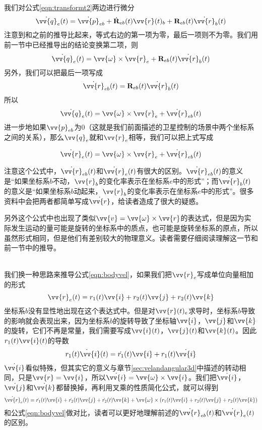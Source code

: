 \documentclass[11pt]{article}
\begin{document}
我们对公式\ref{eqn:transformt2}两边进行微分
\begin{equation*}
\dot{\vv{q}}_{e}(t) = \dot{ \vv{p}}_{eb} + \dot{{\bf R}}_{eb}(t)\vv{r}(t)_b +{\bf R}_{eb}(t)  \dot{\vv{r}}_b(t)
\end{equation*}
注意到和之前的推导比起来，等式右边的第一项为零，最后一项则不为零。我们用前一节中已经推导出的结论变换第二项，则
\begin{equation*}
\dot{\vv{q}}_{e}(t) = \vv{\omega} \times \vv{r}_e +{\bf R}_{eb}(t)  \dot{\vv{r}}_b(t)
\end{equation*}
另外，我们可以把最后一项写成
$$
\dot{\vv{r}}_{eb}(t) = {\bf R}_{eb}(t)  \dot{\vv{r}}_b(t)
$$
所以
$$
\dot{\vv{q}}_{e}(t) = \vv{\omega} \times \vv{r}_e + \dot{\vv{r}}_{eb}(t)
$$
进一步地如果$\vv{p}_{eb}$为0（这就是我们前面描述的卫星控制的场景中两个坐标系之间的关系），那么$\vv{q}_e$就和$\vv{r}_e$相等，我们可以把上式写成

\begin{equation}\label{eqn:bodyvel}
\dot{\vv{r}}_{e}(t) = \vv{\omega} \times \vv{r}_e + \dot{\vv{r}}_{eb}(t)
\end{equation}

注意这个公式中，$\dot{\vv{r}}_{eb}(t)$和$\dot{\vv{r}}_{e}(t)$有很大的区别。$\dot{\vv{r}}_{eb}(t)$的意义是“如果坐标系$b$不动，$\vv{r}_b$的变化率表示在坐标系$e$中的形式”；而$\dot{\vv{r}}_{b}(t)$的意义是“如果坐标系$b$动起来，$\vv{r}_b$的变化率表示在坐标系$e$中的形式”。很多资料中会把两者都简单写成$\dot{\vv{r}}$，给读者造成了很大的疑惑。

另外这个公式中也出现了类似$\vv{v} = \vv{\omega} \times \vv{r}$的表达式，但是因为实际发生运动的量可能是旋转的坐标系中的质点，也可能是旋转坐标系的原点，所以虽然形式相同，但是他们有差别较大的物理意义。读者需要仔细阅读理解这一节和前一节中的推导。

\ \\

我们换一种思路来推导公式\ref{eqn:bodyvel}，如果我们把$\vv{r}_e$写成单位向量相加的形式
$$
\vv{r}_e(t) = r_1(t)\vv{i}+r_2(t)\vv{j}+r_2(t)\vv{k}
$$
坐标系$b$没有显性地出现在这个表达式中。但是对$\vv{r}(t)_e$求导时，坐标系$b$导致的影响就会表现出来，因为坐标系$b$的旋转导致了坐标轴$\vv{i}$，$\vv{j}$和$\vv{k}$的旋转，它们不再是常量，我们需要写成$\vv{i}(t)$，$\vv{j}(t)$和$\vv{k}(t)$。因此$r_1(t)\vv{i}(t)$的导数
$$
\dot{r_1(t)\vv{i}(t)} = \dot{r_1}(t)\vv{i} + r_1(t)\dot{\vv{i}}
$$
$\dot{\vv{i}}$看似特殊，但其实它的意义与章节\ref{sec:velandangular3d}中描述的转动相同，只是$\vv{r} = \vv{i}$，所以$\dot{\vv{i}} = \vv{\omega} \times \vv{i}$。我们把$\dot{\vv{i}}$，$\dot{\vv{j}}$和$\dot{\vv{k}}$都替换掉，再利用叉乘的性质简化公式，就可以得到
$$
\dot{\vv{r}}_e(t) = \dot{r_1}(t)\vv{i}+\dot{r_2}(t)\vv{j}+\dot{r_2}(t)\vv{k} + \vv{\omega} \times (r_1(t)\vv{i}+r_2(t)\vv{j}+r_2(t)\vv{k}) 
$$
和公式\ref{eqn:bodyvel}做对比，读者可以更好地理解前述的$\dot{\vv{r}}_{eb}(t)$和$\dot{\vv{r}}_{e}(t)$的区别。
\end{document}
